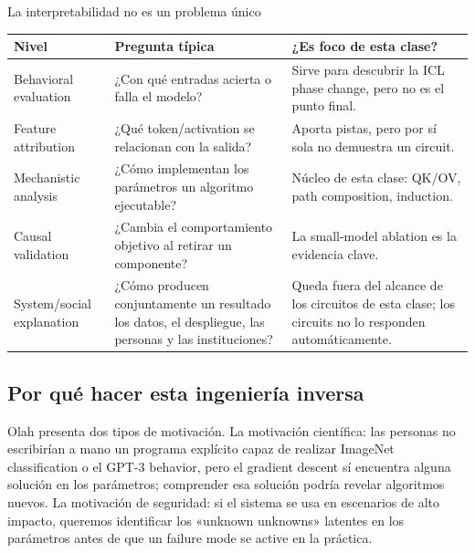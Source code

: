 \documentclass[a4paper]{article}
\begin{document}

\begin{knowledgebox}{La interpretabilidad no es un problema único}
\begin{tabularx}{\textwidth}{L{0.24\textwidth}X X}
\toprule
Nivel & Pregunta típica & ¿Es foco de esta clase? \\
\midrule
Behavioral evaluation & ¿Con qué entradas acierta o falla el modelo? & Sirve para descubrir la ICL phase change, pero no es el punto final. \\
Feature attribution & ¿Qué token/activation se relacionan con la salida? & Aporta pistas, pero por sí sola no demuestra un circuit. \\
Mechanistic analysis & ¿Cómo implementan los parámetros un algoritmo ejecutable? & Núcleo de esta clase: QK/OV, path composition, induction. \\
Causal validation & ¿Cambia el comportamiento objetivo al retirar un componente? & La small-model ablation es la evidencia clave. \\
System/social explanation & ¿Cómo producen conjuntamente un resultado los datos, el despliegue, las personas y las instituciones? & Queda fuera del alcance de los circuitos de esta clase; los circuits no lo responden automáticamente. \\
\bottomrule
\end{tabularx}
\end{knowledgebox}

\subsection{Por qué hacer esta ingeniería inversa}

Olah presenta dos tipos de motivación. La motivación científica: las personas no escribirían a mano un programa explícito capaz de realizar ImageNet classification o el GPT-3 behavior, pero el gradient descent sí encuentra alguna solución en los parámetros; comprender esa solución podría revelar algoritmos nuevos. La motivación de seguridad: si el sistema se usa en escenarios de alto impacto, queremos identificar los «unknown unknowns» latentes en los parámetros antes de que un failure mode se active en la práctica.
\end{document}

